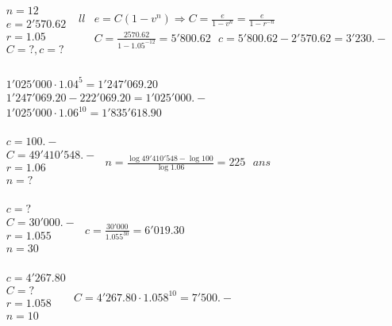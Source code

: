 \begin{solution}
 $\begin{array}{ll}
  & n=12 \\ 
 & e=2'570.62 \\ 
 & r=1.05 \\ 
 & C=?,c=? \\ 
\end{array}$	$\begin{array}{ll}{ll}
  & e=C\left( 1-{{v}^{n}} \right)\Rightarrow C=\frac{e}{1-{{v}^{n}}}=\frac{e}{1-{{r}^{-n}}} \\ 
 & C=\frac{2570.62}{1-{{1.05}^{-12}}}=5'800.62\text{      }c=5'800.62-2'570.62=3'230.- \\ 
\end{array}$   
\end{solution}

\begin{solution}
$\begin{array}{ll}
  & 1'025'000\cdot {{1.04}^{5}}=1'247'069.20 \\ 
 & 1'247'069.20-222'069.20=1'025'000.- \\ 
 & 1'025'000\cdot {{1.06}^{10}}=1'835'618.90 \\ 
\end{array}$
\end{solution}

\begin{solution}
$\begin{array}{ll}
  & c=100.- \\ 
 & C=49'410'548.- \\ 
 & r=1.06 \\ 
 & n=? \\ 
\end{array}$
$n=\frac{\log 49'410'548-\log 100}{\log 1.06}=225\text{ }ans$
\end{solution}

\begin{solution}
$\begin{array}{ll}
  & c=? \\ 
 & C=30'000.- \\ 
 & r=1.055 \\ 
 & n=30 \\ 
\end{array}$
$c=\frac{30'000}{{{1.055}^{30}}}=6'019.30$
\end{solution}

\begin{solution}
$\begin{array}{ll}
  & c=4'267.80 \\ 
 & C=? \\ 
 & r=1.058 \\ 
 & n=10 \\ 
\end{array}$
$C=4'267.80\cdot {{1.058}^{10}}=7'500.-$
\end{solution}

